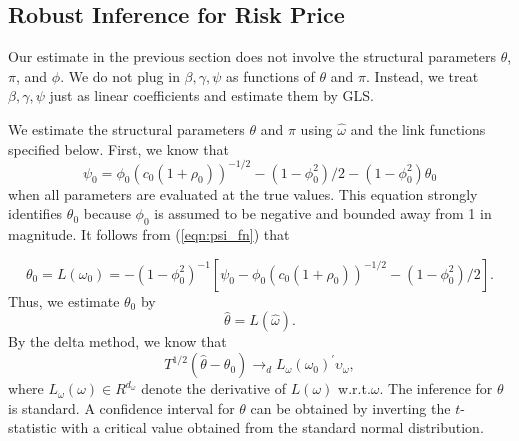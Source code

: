 \documentclass[11pt, letterpaper, twoside]{article}
\begin{document}
\subsection{Robust Inference for Risk Price}




Our estimate in the previous section does not involve the structural parameters $\theta$, $\pi$, and $\phi$.
We do not plug in $\beta ,\gamma ,\psi $ as functions of $\theta $ and $\pi .$ Instead, we treat $\beta ,\gamma ,\psi $ just as linear coefficients and estimate them by GLS.

We estimate the structural parameters $\theta $ and $\pi $ using $\widehat{ \omega}$ and the link functions specified below. 
First, we know that
%
\begin{equation} \label{eqn:psi_fn} 
    \psi_{0}=\phi_{0}\left( c_{0}\left( 1+\rho_{0}\right) \right) ^{-1/2} - \left( 1-\phi_{0}^{2}\right) /2-(1-\phi_{0}^{2})\theta_{0}
\end{equation}
%
when all parameters are evaluated at the true values. 
This equation strongly identifies $\theta_{0}$ because $\phi_{0}$ is assumed to be negative and bounded away from
1 in magnitude.  It follows from (\cref{eqn:psi_fn}) that

\begin{equation}
    \theta_{0} = L(\omega_{0})=-(1-\phi_{0}^{2})^{-1}\left[ \psi_{0}-\phi_{0}\left( c_{0}\left( 1+\rho_{0}\right) \right)^{-1/2}-\left( 1-\phi_{0}^{2}\right) /2\right].
\end{equation}
%
Thus, we estimate $\theta_{0}$ by
%
\begin{equation}
    \widehat{\theta}=L(\widehat{\omega}).
\end{equation}
%
By the delta method, we know that
%
\begin{equation}
 T^{1/2}(\widehat{\theta}-\theta_{0})\rightarrow_{d}L_{\omega}(\omega_{0})^{\prime}\upsilon_{\omega},
\end{equation}
%
where $L_{\omega}(\omega )\in R^{d_{\omega}}$ denote the derivative of $L(\omega )$ w.r.t.\@ $\omega$. 
The inference for $\theta $ is standard. 
A confidence interval for $\theta $ can be obtained by inverting the $t$-statistic with a critical value obtained
from the standard normal distribution.
\end{document}
